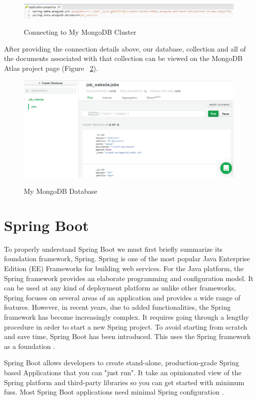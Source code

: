 \begin{figure}[ht]
    \centering
    \includegraphics[scale=0.515]{Images/mongo5.png} 
    \label{mongo5_label}
    \caption{Connecting to My MongoDB Cluster}
\end{figure}
After providing the connection details above, our database, collection and all of the documents associated with that collection can be viewed on the MongoDB Atlas project page (Figure ~\ref{mongo1_label}).

\begin{figure}[ht]
    \centering
    \includegraphics[scale=0.4]{Images/mongo1.png} 
    \label{mongo1_label}
    \caption{My MongoDB Database}
\end{figure}

\section{Spring Boot}
To properly understand Spring Boot we must first briefly summarize its foundation framework, Spring. Spring is one of the most popular Java Enterprise Edition (EE) Frameworks for building  web services. For the Java platform, the Spring framework provides an elaborate programming and configuration model. It can be used at any kind of deployment platform as unlike other frameworks, Spring focuses on several areas of an application and provides a wide range of features. However, in recent years, due to added functionalities, the Spring framework has become increasingly complex. It requires going through a lengthy procedure in order to start a new Spring project. To avoid starting from scratch and save time, Spring Boot has been introduced. This uses the Spring framework as a foundation \cite{DZone:Spring}.

Spring Boot allows developers to create stand-alone, production-grade Spring based Applications that you can "just run".
It take an opinionated view of the Spring platform and third-party libraries so you can get started with minimum fuss. Most Spring Boot applications need minimal Spring configuration \cite{Spring:SpringBoot}.

